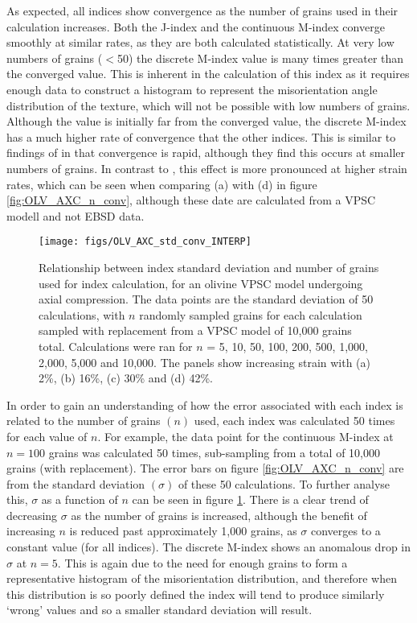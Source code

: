 \documentclass[a4paper,12pt]{report}
\numberwithin{equation}{chapter}
\begin{document}
As expected, all indices show convergence as the number of grains used in their calculation increases. Both the J-index and the continuous M-index converge smoothly at similar rates, as they are both calculated statistically. At very low numbers of grains ($<$50) the discrete M-index value is many times greater than the converged value. This is inherent in the calculation of this index as it requires enough data to construct a histogram to represent the misorientation angle distribution of the texture, which will not be possible with low numbers of grains. Although the value is initially far from the converged value, the discrete M-index has a much higher rate of convergence that the other indices. This is similar to findings of \cite{Skemer} in that convergence is rapid, although they find this occurs at smaller numbers of grains. In contrast to \cite{Skemer}, this effect is more pronounced at higher strain rates, which can be seen when comparing (a) with (d) in figure \ref{fig:OLV_AXC_n_conv}, although these date are calculated from a VPSC modell and not EBSD data.     

\begin{figure}[h!]
  \centering
    \texttt{[image: figs/OLV\_AXC\_std\_conv\_INTERP]}
  \caption[Index error with no. grains (olivine)]{Relationship between index standard deviation and number of grains used for index calculation, for an olivine VPSC model undergoing axial compression. The data points are the standard deviation of 50 calculations, with $n$ randomly sampled grains for each calculation sampled with replacement from a VPSC model of 10,000 grains total. Calculations were ran for $n$ = 5, 10, 50, 100, 200, 500, 1,000, 2,000, 5,000 and 10,000. The panels show increasing strain with (a) 2\%, (b) 16\%, (c) 30\% and (d) 42\%. }
  \label{fig:OLV_AXC_n_conv_err}
\end{figure}


In order to gain an understanding of how the error associated with each index is related to the number of grains $(n)$ used, each index was calculated 50 times for each value of $n$. For example, the data point for the continuous M-index at $n = 100$ grains was calculated 50 times, sub-sampling from a total of 10,000 grains (with replacement). The error bars on figure \ref{fig:OLV_AXC_n_conv} are from the standard deviation $(\sigma)$ of these 50 calculations. To further analyse this, $\sigma$ as a function of $n$ can be seen in figure \ref{fig:OLV_AXC_n_conv_err}. There is a clear trend of decreasing $\sigma$ as the number of grains is increased, although the benefit of increasing $n$ is reduced past approximately 1,000 grains, as $\sigma$ converges to a constant value (for all indices). The discrete M-index shows an anomalous drop in $\sigma$ at $n = 5$. This is again due to the need for enough grains to form a representative histogram of the misorientation distribution, and therefore when this distribution is so poorly defined the index will tend to produce similarly \lq{}wrong\rq{} values and so a smaller standard deviation will result.
\end{document}

